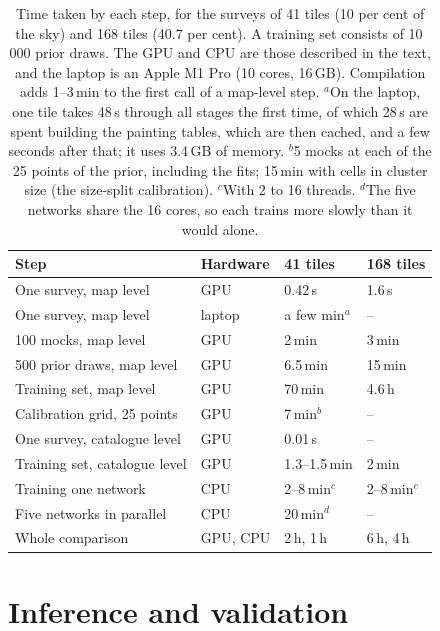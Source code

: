 \begin{table}
\centering
\caption{Time taken by each step, for the surveys of 41 tiles (10 per cent of the sky) and 168 tiles (40.7
per cent). A training set consists of 10\,000 prior draws. The GPU and CPU are those described in the
text, and the laptop is an Apple M1 Pro (10 cores, 16\,GB). Compilation adds 1--3\,min to the first call of
a map-level step. $^a$On the laptop, one tile takes 48\,s through all stages the first time, of which 28\,s
are spent building the painting tables, which are then cached, and a few seconds after that; it uses
3.4\,GB of memory. $^b$5 mocks at each of the 25 points of the prior, including the fits; 15\,min with
cells in cluster size (the size-split calibration). $^c$With 2 to 16 threads. $^d$The five networks share
the 16 cores, so each trains more slowly than it would alone.}
\label{tab:cost}
\small
\setlength{\tabcolsep}{3pt}
\begin{tabular}{@{}llll@{}}
\toprule
Step & Hardware & 41 tiles & 168 tiles \\
\midrule
One survey, map level           & GPU       & 0.42\,s       & 1.6\,s \\
One survey, map level           & laptop    & a few min$^a$ & -- \\
100 mocks, map level            & GPU       & 2\,min        & 3\,min \\
500 prior draws, map level      & GPU       & 6.5\,min      & 15\,min \\
Training set, map level         & GPU       & 70\,min       & 4.6\,h \\
Calibration grid, 25 points     & GPU       & 7\,min$^b$    & -- \\
One survey, catalogue level     & GPU       & 0.01\,s       & -- \\
Training set, catalogue level   & GPU       & 1.3--1.5\,min & 2\,min \\
Training one network            & CPU       & 2--8\,min$^c$ & 2--8\,min$^c$ \\
Five networks in parallel       & CPU       & 20\,min$^d$   & -- \\
Whole comparison                & GPU, CPU  & 2\,h, 1\,h    & 6\,h, 4\,h \\
\bottomrule
\end{tabular}
\end{table}

\section{Inference and validation}\label{sec:inference}

